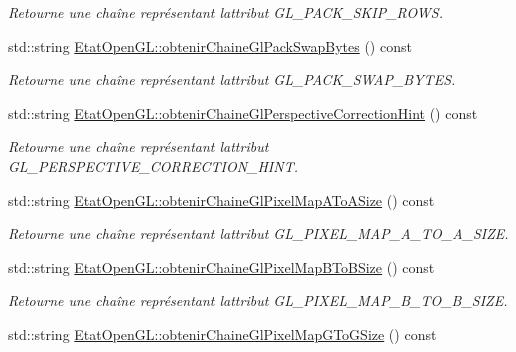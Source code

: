 \begin{DoxyCompactItemize}
\begin{DoxyCompactList}\small\item\em Retourne une chaîne représentant l\textquotesingle{}attribut G\+L\+\_\+\+P\+A\+C\+K\+\_\+\+S\+K\+I\+P\+\_\+\+R\+O\+W\+S. \end{DoxyCompactList}\item 
std\+::string \hyperlink{group__utilitaire_ga34c8e9bce5b0b759995934900bc33e14}{Etat\+Open\+G\+L\+::obtenir\+Chaine\+Gl\+Pack\+Swap\+Bytes} () const 
\begin{DoxyCompactList}\small\item\em Retourne une chaîne représentant l\textquotesingle{}attribut G\+L\+\_\+\+P\+A\+C\+K\+\_\+\+S\+W\+A\+P\+\_\+\+B\+Y\+T\+E\+S. \end{DoxyCompactList}\item 
std\+::string \hyperlink{group__utilitaire_ga2f8a371d540a654c038ff2e3301a63d3}{Etat\+Open\+G\+L\+::obtenir\+Chaine\+Gl\+Perspective\+Correction\+Hint} () const 
\begin{DoxyCompactList}\small\item\em Retourne une chaîne représentant l\textquotesingle{}attribut G\+L\+\_\+\+P\+E\+R\+S\+P\+E\+C\+T\+I\+V\+E\+\_\+\+C\+O\+R\+R\+E\+C\+T\+I\+O\+N\+\_\+\+H\+I\+N\+T. \end{DoxyCompactList}\item 
std\+::string \hyperlink{group__utilitaire_ga6d92a97f95de6e5eb298d27c342a4375}{Etat\+Open\+G\+L\+::obtenir\+Chaine\+Gl\+Pixel\+Map\+A\+To\+A\+Size} () const 
\begin{DoxyCompactList}\small\item\em Retourne une chaîne représentant l\textquotesingle{}attribut G\+L\+\_\+\+P\+I\+X\+E\+L\+\_\+\+M\+A\+P\+\_\+\+A\+\_\+\+T\+O\+\_\+\+A\+\_\+\+S\+I\+Z\+E. \end{DoxyCompactList}\item 
std\+::string \hyperlink{group__utilitaire_ga554e72e1ef666b6dca527a1073219c9e}{Etat\+Open\+G\+L\+::obtenir\+Chaine\+Gl\+Pixel\+Map\+B\+To\+B\+Size} () const 
\begin{DoxyCompactList}\small\item\em Retourne une chaîne représentant l\textquotesingle{}attribut G\+L\+\_\+\+P\+I\+X\+E\+L\+\_\+\+M\+A\+P\+\_\+\+B\+\_\+\+T\+O\+\_\+\+B\+\_\+\+S\+I\+Z\+E. \end{DoxyCompactList}\item 
std\+::string \hyperlink{group__utilitaire_gad80ac227ca04522df384be1e0f93b546}{Etat\+Open\+G\+L\+::obtenir\+Chaine\+Gl\+Pixel\+Map\+G\+To\+G\+Size} () const 

\end{DoxyCompactItemize}
